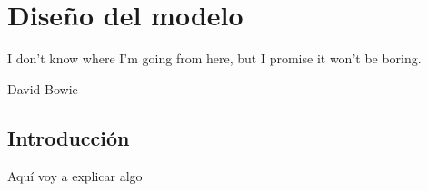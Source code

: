 \chapter{Diseño del modelo}\label{chp-02}
\epigraph{I don't know where I'm going from here, but I promise it won't be boring.}{David Bowie}

\section{Introducción}
Aquí voy a explicar algo


\endinput